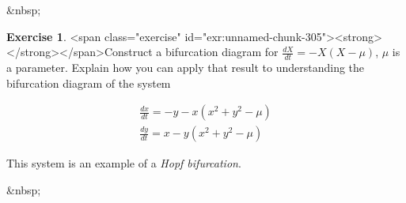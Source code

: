 \documentclass[
]{book}
\theoremstyle{definition}
\theoremstyle{definition}
\theoremstyle{definition}
\newtheorem{exercise}{Exercise}[chapter]
\theoremstyle{remark}
\begin{document}
&nbsp;
\begin{exercise}
<span class="exercise" id="exr:unnamed-chunk-305"><strong>\label{exr:unnamed-chunk-305} </strong></span>Construct a bifurcation diagram for $\displaystyle \frac{dX}{dt} = - X(X-\mu)$, $\mu$ is a parameter.  Explain how you can apply that result to understanding the bifurcation diagram of the system

\begin{align*}
\frac{dx}{dt} =-y- x(x^2+y^2-\mu) \\
\frac{dy}{dt}=x- y(x^2+y^2-\mu)
\end{align*}
  
This system is an example of a \emph{Hopf bifurcation}.
\end{exercise}


&nbsp;
\end{document}
